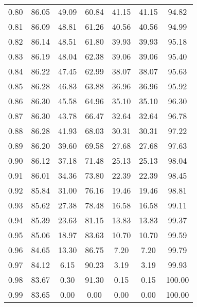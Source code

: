 \begin{tabular}{|c|c|c|c|c|c|c|}
      0.80 &     86.05 &     49.09 &      60.84 &   41.15 &      41.15 &         94.82 \\
      0.81 &     86.09 &     48.81 &      61.26 &   40.56 &      40.56 &         94.99 \\
      0.82 &     86.14 &     48.51 &      61.80 &   39.93 &      39.93 &         95.18 \\
      0.83 &     86.19 &     48.04 &      62.38 &   39.06 &      39.06 &         95.40 \\
      0.84 &     86.22 &     47.45 &      62.99 &   38.07 &      38.07 &         95.63 \\
      0.85 &     86.28 &     46.83 &      63.88 &   36.96 &      36.96 &         95.92 \\
      0.86 &     86.30 &     45.58 &      64.96 &   35.10 &      35.10 &         96.30 \\
      0.87 &     86.30 &     43.78 &      66.47 &   32.64 &      32.64 &         96.78 \\
      0.88 &     86.28 &     41.93 &      68.03 &   30.31 &      30.31 &         97.22 \\
      0.89 &     86.20 &     39.60 &      69.58 &   27.68 &      27.68 &         97.63 \\
      0.90 &     86.12 &     37.18 &      71.48 &   25.13 &      25.13 &         98.04 \\
      0.91 &     86.01 &     34.36 &      73.80 &   22.39 &      22.39 &         98.45 \\
      0.92 &     85.84 &     31.00 &      76.16 &   19.46 &      19.46 &         98.81 \\
      0.93 &     85.62 &     27.38 &      78.48 &   16.58 &      16.58 &         99.11 \\
      0.94 &     85.39 &     23.63 &      81.15 &   13.83 &      13.83 &         99.37 \\
      0.95 &     85.06 &     18.97 &      83.63 &   10.70 &      10.70 &         99.59 \\
      0.96 &     84.65 &     13.30 &      86.75 &    7.20 &       7.20 &         99.79 \\
      0.97 &     84.12 &      6.15 &      90.23 &    3.19 &       3.19 &         99.93 \\
      0.98 &     83.67 &      0.30 &      91.30 &    0.15 &       0.15 &        100.00 \\
      0.99 &     83.65 &      0.00 &       0.00 &    0.00 &       0.00 &        100.00 \\
\bottomrule
\end{tabular}
